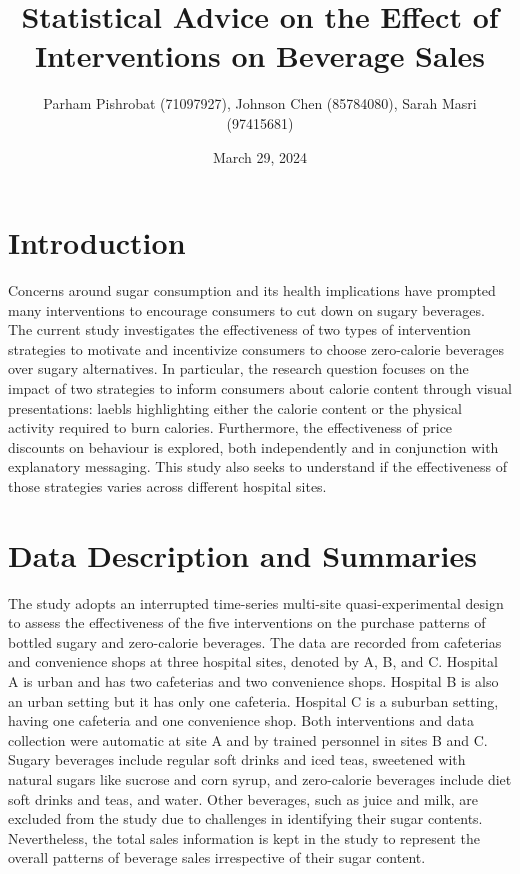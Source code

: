 \documentclass[
]{article}
\title{Statistical Advice on the Effect of Interventions on Beverage Sales}
\author{Parham Pishrobat (71097927), Johnson Chen (85784080), Sarah Masri (97415681)}
\date{March 29, 2024}
\begin{document}
\maketitle

{
\setcounter{tocdepth}{2}
\tableofcontents
}
\pagebreak

\hypertarget{introduction}{%
\section{Introduction}\label{introduction}}

Concerns around sugar consumption and its health implications have prompted many interventions to encourage consumers to cut down on sugary beverages. The current study investigates the effectiveness of two types of intervention strategies to motivate and incentivize consumers to choose zero-calorie beverages over sugary alternatives. In particular, the research question focuses on the impact of two strategies to inform consumers about calorie content through visual presentations: laebls highlighting either the calorie content or the physical activity required to burn calories. Furthermore, the effectiveness of price discounts on behaviour is explored, both independently and in conjunction with explanatory messaging. This study also seeks to understand if the effectiveness of those strategies varies across different hospital sites.

\hypertarget{data-description-and-summaries}{%
\section{Data Description and Summaries}\label{data-description-and-summaries}}

The study adopts an interrupted time-series multi-site quasi-experimental design to assess the effectiveness of the five interventions on the purchase patterns of bottled sugary and zero-calorie beverages. The data are recorded from cafeterias and convenience shops at three hospital sites, denoted by A, B, and C. Hospital A is urban and has two cafeterias and two convenience shops. Hospital B is also an urban setting but it has only one cafeteria. Hospital C is a suburban setting, having one cafeteria and one convenience shop. Both interventions and data collection were automatic at site A and by trained personnel in sites B and C. Sugary beverages include regular soft drinks and iced teas, sweetened with natural sugars like sucrose and corn syrup, and zero-calorie beverages include diet soft drinks and teas, and water. Other beverages, such as juice and milk, are excluded from the study due to challenges in identifying their sugar contents. Nevertheless, the total sales information is kept in the study to represent the overall patterns of beverage sales irrespective of their sugar content.
\end{document}
